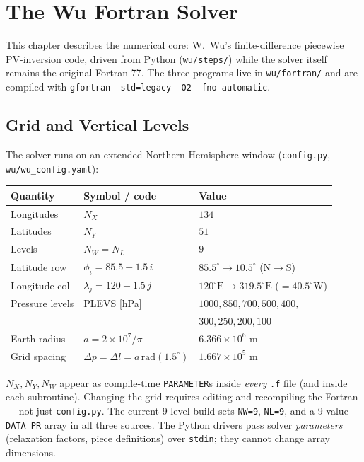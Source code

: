 \chapter{The Wu Fortran Solver}
\label{chap:wu_solver}

This chapter describes the numerical core: W.~Wu's finite-difference
piecewise PV-inversion code, driven from Python (\texttt{wu/steps/})
while the solver itself remains the original Fortran-77.  The three
programs live in \texttt{wu/fortran/} and are compiled with
\texttt{gfortran -std=legacy -O2 -fno-automatic}.

\section{Grid and Vertical Levels}
\label{sec:wu_grid}

The solver runs on an extended Northern-Hemisphere window
(\texttt{config.py}, \texttt{wu/wu\_config.yaml}):

\begin{center}\small
\begin{tabular}{lll}
  \toprule
  Quantity & Symbol / code & Value \\
  \midrule
  Longitudes & $N_X$ & $134$ \\
  Latitudes  & $N_Y$ & $51$ \\
  Levels     & $N_W=N_L$ & $9$ \\
  Latitude row & $\phi_i = 85.5 - 1.5\,i$ & $85.5^\circ\!\to\!10.5^\circ$ (N$\to$S) \\
  Longitude col & $\lambda_j = 120 + 1.5\,j$ & $120^\circ\mathrm{E}\!\to\!319.5^\circ\mathrm{E}$ ($=40.5^\circ$W) \\
  Pressure levels & PLEVS [hPa] & $1000,850,700,500,400,$ \\
                  &             & $300,250,200,100$ \\
  Earth radius & $a=2\times10^{7}/\pi$ & $6.366\times10^{6}$ m \\
  Grid spacing & $\Delta p=\Delta l = a\,\mathrm{rad}(1.5^\circ)$ & $1.667\times10^{5}$ m \\
  \bottomrule
\end{tabular}
\end{center}

\begin{warnbox}
$N_X,N_Y,N_W$ appear as compile-time \texttt{PARAMETER}s inside
\emph{every} \texttt{.f} file (and inside each subroutine).  Changing the
grid requires editing and recompiling the Fortran --- not just
\texttt{config.py}.  The current 9-level build sets \texttt{NW=9},
\texttt{NL=9}, and a 9-value \texttt{DATA PR} array in all three sources.
The Python drivers pass solver \emph{parameters} (relaxation factors,
piece definitions) over \texttt{stdin}; they cannot change array
dimensions.
\end{warnbox}

